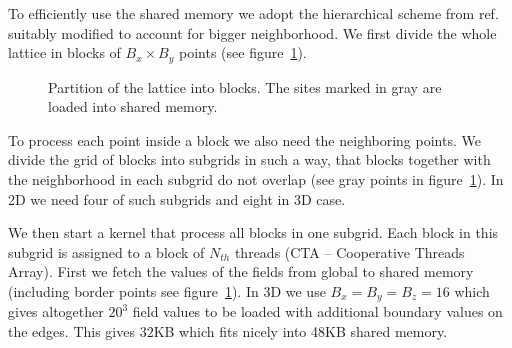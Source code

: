 \documentclass[a4paper]{llncs}
\newcommand{\fillblockgray}[2]{
\pgfmathtruncatemacro\llx{\bksize*(#1)-2}
\pgfmathtruncatemacro\lly{\bksize*(#2)-2}
\pgfmathtruncatemacro\urx{\bksize*(#1+1)+1}
\pgfmathtruncatemacro\ury{\bksize*(#2+1)+1}
\foreach \x in {\llx, ..., \urx}
  \foreach \y in {\lly,...,\ury} {
    \fill[gray] (\x, \y) circle(.25);
  }
}
\newcommand{\npartition}[3]{
\pgfmathtruncatemacro\row{Mod(#2,4)}
\ifnum \row = 0
   \pgfmathtruncatemacro\num{Mod(#1,4)}
\else \ifnum \row  = 1
   \pgfmathtruncatemacro\num{Mod(#1,4)+4}
\else \ifnum \row  = 2
   \pgfmathtruncatemacro\num{Mod(Mod(#1,4)+2,4)}
\else \ifnum \row  = 3
   \pgfmathtruncatemacro\num{Mod(Mod(#1,4)+2,4)+4}
\fi
\fi
\fi
\fi
\ifnum \num = #3
\draw[draw=black,fill=red] (#1, #2) circle(0.4);
\fi

}
\newcommand{\markpartition}[3]{
\pgfmathtruncatemacro\llx{\bksize*(#1)}
\pgfmathtruncatemacro\lly{\bksize*(#2)}
\pgfmathtruncatemacro\urx{\bksize*(#1+1)-1}
\pgfmathtruncatemacro\ury{\bksize*(#2+1)-1}
\foreach \x in {\llx, ..., \urx}
  \foreach \y in {\lly,...,\ury} {
    \npartition{\x}{\y}{#3}
  }
}
\def\bksize{8}
\def\bkcount{4}
\def\lcsize{5}
\begin{document}
To efficiently use the shared memory we adopt the hierarchical scheme from
ref.~\cite{weigel} suitably modified to account for bigger neighborhood. We
first divide the whole lattice in blocks of $B_x\times B_y$ points (see
figure~\ref{fig:blocks}).

\begin{figure}
\begin{center}

\end{center}
\caption{\label{fig:blocks}Partition of the lattice into
  blocks.  The sites
marked in gray are loaded into shared memory.}
\end{figure}

To process each point inside a block we also need the neighboring points. We
divide the grid of blocks into subgrids in such a way, that blocks together
with the neighborhood in each subgrid do not overlap (see gray points in
figure~\ref{fig:blocks}). In 2D we need four of such subgrids and eight in 3D
case.

We then start a kernel that process all blocks in one subgrid. Each block in
this subgrid is assigned to a block of $N_{th}$ threads (CTA -- Cooperative
Threads Array). First we fetch the values of the fields from global to shared
memory (including border points see figure~\ref{fig:blocks}). In 3D we use
$B_x=B_y=B_z=16$ which gives altogether $20^3$ field values to be loaded with
additional boundary values on the edges. This gives $32$KB which fits nicely
into 48KB shared memory.
\end{document}
